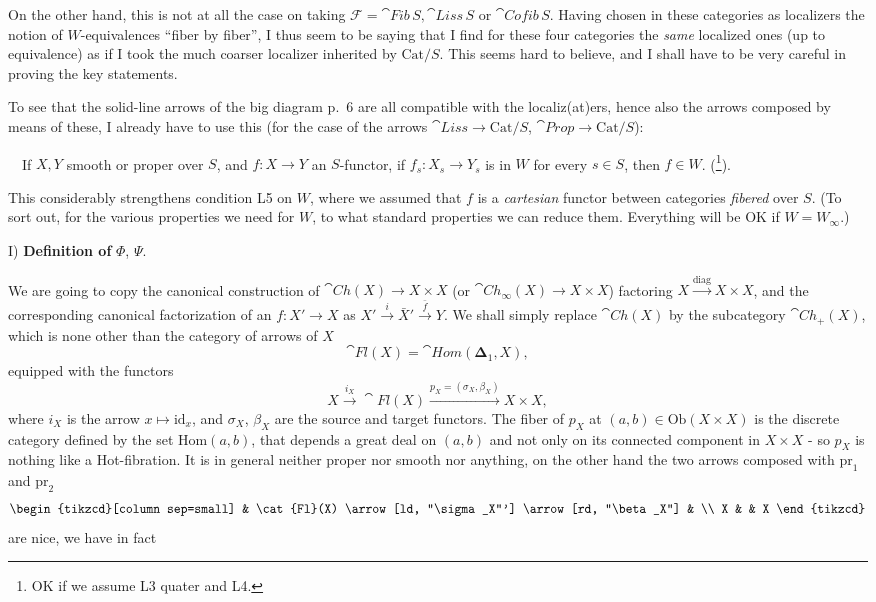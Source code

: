 On the other hand, this is not at all the case on taking $\mathcal{F} = \cat{Fib}\,S, \cat{Liss}\,S$ or $\cat{Cofib}\,S$. Having chosen in these categories as localizers the notion of $W$-equivalences ``fiber by fiber'', I thus seem to be saying that I find for these four categories the \textit{same} localized ones (up to equivalence) as if I took the much coarser localizer inherited by $\mathrm{Cat}/S$. This seems hard to believe, and I shall have to be very careful in proving the key statements.

To see that the solid-line arrows of the big diagram p.~6 are all compatible with the localiz(at)ers, hence also the arrows composed by means of these, I already have to use this (for the case of the arrows $\cat{Liss} \longrightarrow \mathrm{Cat}/S$, $\cat{Prop} \longrightarrow \mathrm{Cat}/S$):

\ \ If $X, Y$ smooth or proper over $S$, and $f : X \longrightarrow Y$ an $S$-functor, if $f_s : X_s \longrightarrow Y_s$ is in $W$ for every $s \in S$, then $f \in W$. (\footnote[7]{OK if we assume L3 quater and L4.}).

This considerably strengthens condition L5 on $W$, where we assumed that $f$ is a \textit{cartesian} functor between categories \textit{fibered} over $S$. (To sort out, for the various properties we need for $W$, to what standard properties we can reduce them. Everything will be OK if $W = W_\infty$.)

I) \textbf{Definition of} $\Phi$, $\Psi$.

We are going to copy the canonical construction of $\cat{Ch}(X) \longrightarrow X \times X$ (or $\cat{Ch}_\infty(X) \longrightarrow X \times X$) factoring $X \xrightarrow{\mathrm{diag}} X \times X$, and the corresponding canonical factorization of an $f : X' \longrightarrow X$ as $X' \xrightarrow{i} \bar{X}' \xrightarrow{\bar{f}} Y$. We shall simply replace $\cat{Ch}(X)$ by the subcategory $\cat{Ch}_+(X)$, which is none other than the category of arrows of $X$
\[
\cat{Fl}(X) = \cat{Hom}(\boldsymbol{\Delta}_1, X),
\]
equipped with the functors
\[
X \xrightarrow{i_X} \cat{Fl}(X) \xrightarrow{p_X=(\sigma_X,\beta_X)} X \times X,
\]
where $i_X$ is the arrow $x \longmapsto \mathrm{id}_x$, and $\sigma_X$, $\beta_X$ are the source and target functors. The fiber of $p_X$ at $(a,b) \in \mathrm{Ob}(X \times X)$ is the discrete category defined by the set $\mathrm{Hom}(a,b)$, that depends a great deal on $(a,b)$ and not only on its connected component in $X \times X$ - so $p_X$ is nothing like a Hot-fibration. It is in general neither proper nor smooth nor anything, on the other hand the two arrows composed with $\mathrm{pr}_1$ and $\mathrm{pr}_2$ %
\[
\begin{tikzcd}[column sep=small]
& \cat{Fl}(X) \arrow[ld, "\sigma_X"'] \arrow[rd, "\beta_X"] & \\
X & & X
\end{tikzcd}
\]
are nice, we have in fact

